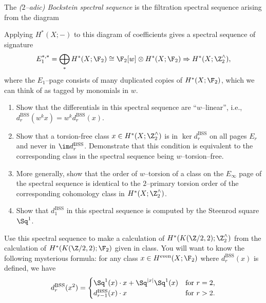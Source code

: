 \newcommand{\BSS}{\mathrm{BSS}}

\begin{problem}
The \textit{($2$--adic) Bockstein spectral sequence} is the filtration spectral sequence arising from the diagram
\begin{center}
\end{center}
Applying $H^*(X; -)$ to this diagram of coefficients gives a spectral sequence of signature \[E_1^{*, *} = \bigoplus_* H^*(X; \F_2) \cong \F_2[w] \otimes H^*(X; \F_2) \Rightarrow H^*(X; \Z^\wedge_2),\] where the $E_1$--page consists of many duplicated copies of $H^*(X; \F_2)$, which we can think of as tagged by monomials in $w$.
\begin{enumerate}
    \item Show that the differentials in this spectral sequence are ``$w$--linear'', i.e., $d^{\BSS}_r(w^k x) = w^k d^{\BSS}_r(x)$.
    \item Show that a torsion-free class $x \in H^*(X; \Z^\wedge_2)$ is in $\ker d^{\BSS}_r$ on all pages $E_r$ and never in $\im d^{\BSS}_r$.  Demonstrate that this condition is equivalent to the corresponding class in the spectral sequence being $w$--torsion--free.
    \item More generally, show that the order of $w$--torsion of a class on the $E_\infty$ page of the spectral sequence is identical to the $2$--primary torsion order of the corresponding cohomology class in $H^*(X; \Z^\wedge_2)$.
    \item Show that $d^{\BSS}_1$ in this spectral sequence is computed by the Steenrod square $\Sq^1$.
\end{enumerate}
\end{problem}

\begin{problem}
Use this spectral sequence to make a calculation of $H^*(K(\Z/2, 2); \Z^\wedge_2)$ from the calculation of $H^*(K(\Z/2, 2); \F_2)$ given in class.  You will want to know the following mysterious formula: for any class $x \in H^{\mathrm{even}}(X; \F_2)$ where $d_r^{\BSS}(x)$ is defined, we have \[d^{\BSS}_r(x^2) = \begin{cases} \Sq^1(x) \cdot x + \Sq^{|x|}\Sq^1(x) & \text{for $r = 2$}, \\ d^{\BSS}_{r-1}(x) \cdot x & \text{for $r > 2$}. \end{cases}\]
\end{problem}


